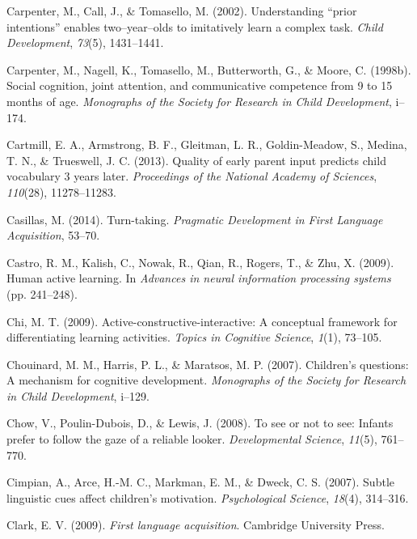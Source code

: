 \documentclass[oneside]{report}
\begin{document}
\leavevmode\hypertarget{ref-carpenter2002understanding}{}%
Carpenter, M., Call, J., \& Tomasello, M. (2002). Understanding ``prior
intentions'' enables two--year--olds to imitatively learn a complex
task. \emph{Child Development}, \emph{73}(5), 1431--1441.

\leavevmode\hypertarget{ref-carpenter1998social}{}%
Carpenter, M., Nagell, K., Tomasello, M., Butterworth, G., \& Moore, C.
(1998b). Social cognition, joint attention, and communicative competence
from 9 to 15 months of age. \emph{Monographs of the Society for Research
in Child Development}, i--174.

\leavevmode\hypertarget{ref-cartmill2013quality}{}%
Cartmill, E. A., Armstrong, B. F., Gleitman, L. R., Goldin-Meadow, S.,
Medina, T. N., \& Trueswell, J. C. (2013). Quality of early parent input
predicts child vocabulary 3 years later. \emph{Proceedings of the
National Academy of Sciences}, \emph{110}(28), 11278--11283.

\leavevmode\hypertarget{ref-casillas2014turn}{}%
Casillas, M. (2014). Turn-taking. \emph{Pragmatic Development in First
Language Acquisition}, 53--70.

\leavevmode\hypertarget{ref-castro2009human}{}%
Castro, R. M., Kalish, C., Nowak, R., Qian, R., Rogers, T., \& Zhu, X.
(2009). Human active learning. In \emph{Advances in neural information
processing systems} (pp. 241--248).

\leavevmode\hypertarget{ref-chi2009active}{}%
Chi, M. T. (2009). Active-constructive-interactive: A conceptual
framework for differentiating learning activities. \emph{Topics in
Cognitive Science}, \emph{1}(1), 73--105.

\leavevmode\hypertarget{ref-chouinard2007children}{}%
Chouinard, M. M., Harris, P. L., \& Maratsos, M. P. (2007). Children's
questions: A mechanism for cognitive development. \emph{Monographs of
the Society for Research in Child Development}, i--129.

\leavevmode\hypertarget{ref-chow2008see}{}%
Chow, V., Poulin-Dubois, D., \& Lewis, J. (2008). To see or not to see:
Infants prefer to follow the gaze of a reliable looker.
\emph{Developmental Science}, \emph{11}(5), 761--770.

\leavevmode\hypertarget{ref-cimpian2007subtle}{}%
Cimpian, A., Arce, H.-M. C., Markman, E. M., \& Dweck, C. S. (2007).
Subtle linguistic cues affect children's motivation. \emph{Psychological
Science}, \emph{18}(4), 314--316.

\leavevmode\hypertarget{ref-clark2009first}{}%
Clark, E. V. (2009). \emph{First language acquisition}. Cambridge
University Press.
\end{document}
